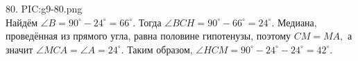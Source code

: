 80. {{PIC:g9-80.png}}\\
Найдём $\angle B=90^\circ-24^\circ=66^\circ.$ Тогда $\angle BCH=90^\circ-66^\circ=24^\circ.$ Медиана, проведённая из прямого угла, равна половине гипотенузы, поэтому $CM=MA,$ а значит $\angle MCA=\angle A=24^\circ.$ Таким образом, $\angle HCM=90^\circ-24^\circ-24^\circ=42^\circ.$\\
